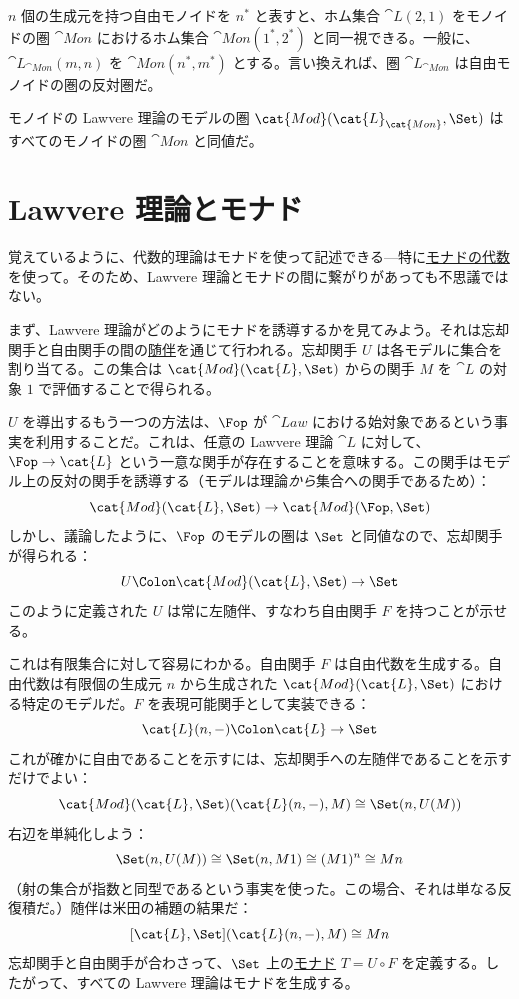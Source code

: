 $n$ 個の生成元を持つ自由モノイドを $n^*$ と表すと、ホム集合 $\cat{L}(2, 1)$ をモノイドの圏 $\cat{Mon}$ におけるホム集合 $\cat{Mon}(1^*, 2^*)$ と同一視できる。一般に、$\cat{L}_{\cat{Mon}}(m, n)$ を $\cat{Mon}(n^*, m^*)$ とする。言い換えれば、圏 $\cat{L}_{\cat{Mon}}$ は自由モノイドの圏の反対圏だ。

モノイドの Lawvere 理論のモデルの圏 $\cat{Mod}(\cat{L}_{\cat{Mon}}, \Set)$ はすべてのモノイドの圏 $\cat{Mon}$ と同値だ。

\section{Lawvere 理論とモナド}

覚えているように、代数的理論はモナドを使って記述できる—特に\hyperref[algebras-for-monads]{モナドの代数}を使って。そのため、Lawvere 理論とモナドの間に繋がりがあっても不思議ではない。

まず、Lawvere 理論がどのようにモナドを誘導するかを見てみよう。それは忘却関手と自由関手の間の\hyperref[free-forgetful-adjunctions]{随伴}を通じて行われる。忘却関手 $U$ は各モデルに集合を割り当てる。この集合は $\cat{Mod}(\cat{L}, \Set)$ からの関手 $M$ を $\cat{L}$ の対象 $1$ で評価することで得られる。

$U$ を導出するもう一つの方法は、$\Fop$ が $\cat{Law}$ における始対象であるという事実を利用することだ。これは、任意の Lawvere 理論 $\cat{L}$ に対して、$\Fop \to \cat{L}$ という一意な関手が存在することを意味する。この関手はモデル上の反対の関手を誘導する（モデルは理論\emph{から}集合への関手であるため）：
\[\cat{Mod}(\cat{L}, \Set) \to \cat{Mod}(\Fop, \Set)\]
しかし、議論したように、$\Fop$ のモデルの圏は $\Set$ と同値なので、忘却関手が得られる：
\[U \Colon \cat{Mod}(\cat{L}, \Set) \to \Set\]
このように定義された $U$ は常に左随伴、すなわち自由関手 $F$ を持つことが示せる。

これは有限集合に対して容易にわかる。自由関手 $F$ は自由代数を生成する。自由代数は有限個の生成元 $n$ から生成された $\cat{Mod}(\cat{L}, \Set)$ における特定のモデルだ。$F$ を表現可能関手として実装できる：
\[\cat{L}(n, -) \Colon \cat{L} \to \Set\]
これが確かに自由であることを示すには、忘却関手への左随伴であることを示すだけでよい：
\[\cat{Mod}(\cat{L}, \Set)(\cat{L}(n, -), M) \cong \Set(n, U(M))\]
右辺を単純化しよう：
\[\Set(n, U(M)) \cong \Set(n, M 1) \cong (M 1)^n \cong M n\]
（射の集合が指数と同型であるという事実を使った。この場合、それは単なる反復積だ。）随伴は米田の補題の結果だ：
\[[\cat{L}, \Set](\cat{L}(n, -), M) \cong M n\]
忘却関手と自由関手が合わさって、$\Set$ 上の\hyperref[monads-categorically]{モナド} $T = U \circ F$ を定義する。したがって、すべての Lawvere 理論はモナドを生成する。

